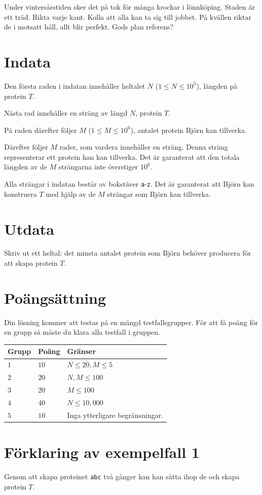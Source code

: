 Under vintersårstiden sker det på tok för många krockar i lönnköping.
Staden är ett träd. Rikta varje kant. Kolla att alla kan ta sig till jobbet.
På kvällen riktar de i motsatt håll, allt blir perfekt. Gods plan referens? 

\section*{Indata}
Den första raden i indatan innehåller heltalet $N$ ($1 \le N \le 10^5$), längden på protein $T$.

Nästa rad innehåller en sträng av längd $N$, protein $T$.

På raden därefter följer $M$ ($1 \le M \le 10^6$), antalet protein Björn kan tillverka.

Därefter följer $M$ rader, som vardera innehåller en sträng. Denna sträng representerar ett protein han
kan tillverka. Det är garanterat att den totala längden av de $M$ strängarna inte överstiger $10^6$.

Alla strängar i indatan består av bokstäver \texttt{a}-\texttt{z}. Det är garanterat att Björn kan konstruera $T$ med hjälp av de $M$ strängar som Björn kan tillverka.

\section*{Utdata}
Skriv ut ett heltal: det minsta antalet protein som Björn behöver producera för att skapa protein $T$.


\section*{Poängsättning}
Din lösning kommer att testas på en mängd testfallsgrupper.
För att få poäng för en grupp så måste du klara alla testfall i gruppen.

\noindent
\begin{tabular}{| l | l | p{12cm} |}
  \hline
  \textbf{Grupp} & \textbf{Poäng} & \textbf{Gränser} \\ \hline
  $1$    & $10$       & $N \leq 20, M \leq 5$ \\ \hline
  $2$    & $20$       & $N, M \leq 100$ \\ \hline
  $3$    & $20$       & $M \leq 100$ \\ \hline
  $4$    & $40$       & $N \leq 10,000$ \\ \hline
  $5$    & $10$       & Inga ytterligare begränsningar. \\ \hline
\end{tabular}

\section*{Förklaring av exempelfall 1}
Genom att skapa proteinet \texttt{abc} två gånger kan han sätta ihop de och skapa protein $T$.
